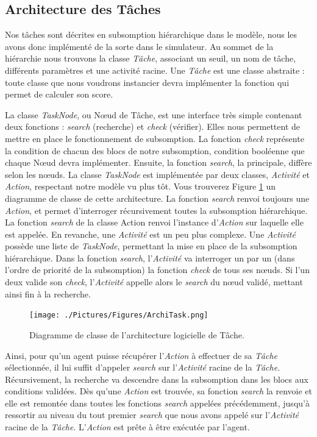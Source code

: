 			\subsection{Architecture des Tâches}
			Nos tâches sont décrites en subsomption hiérarchique dans le modèle, nous les avons donc implémenté de la sorte dans le simulateur. Au sommet de la hiérarchie nous trouvons la classe \textit{Tâche}, associant un seuil, un nom de tâche, différents paramètres et une activité racine. Une \textit{Tâche} est une classe abstraite : toute classe que nous voudrons instancier devra implémenter la fonction qui permet de calculer son score.
			
			La classe \textit{TaskNode}, ou Nœud de Tâche, est une interface très simple contenant deux fonctions : \textit{search} (recherche) et \textit{check} (vérifier). Elles nous permettent de mettre en place le fonctionnement de subsomption. La fonction \textit{check} représente la condition de chacun des blocs de notre subsomption, condition booléenne que chaque Nœud devra implémenter. Ensuite, la fonction \textit{search}, la principale, diffère selon les nœuds. La classe \textit{TaskNode} est implémentée par deux classes, \textit{Activité} et \textit{Action}, respectant notre modèle vu plus tôt. Vous trouverez Figure \ref{ArchiTask} un diagramme de classe de cette architecture. La fonction \textit{search} renvoi toujours une \textit{Action}, et permet d'interroger récursivement toutes la subsomption hiérarchique. La fonction \textit{search} de la classe Action renvoi l'instance d'\textit{Action} sur laquelle elle est appelée. En revanche, une \textit{Activité} est un peu plus complexe. Une \textit{Activité} possède une liste de \textit{TaskNode}, permettant la mise en place de la subsomption hiérarchique. Dans la fonction \textit{search}, l'\textit{Activité} va interroger un par un (dans l'ordre de priorité de la subsomption) la fonction \textit{check} de tous ses nœuds. Si l'un deux valide son \textit{check}, l'\textit{Activité} appelle alors le \textit{search} du nœud validé, mettant ainsi fin à la recherche.
			
			\begin{figure}
			\centering
			\texttt{[image: ./Pictures/Figures/ArchiTask.png]}
			\caption{Diagramme de classe de l'architecture logicielle de Tâche.}
			\label{ArchiTask}
			\end{figure}
			
			Ainsi, pour qu'un agent puisse récupérer l'\textit{Action} à effectuer de sa \textit{Tâche} sélectionnée, il lui suffit d'appeler \textit{search} sur l'\textit{Activité} racine de la \textit{Tâche}. Récursivement, la recherche va descendre dans la subsomption dans les blocs aux conditions validées. Dès qu'une \textit{Action} est trouvée, sa fonction \textit{search} la renvoie et elle est remontée dans toutes les fonctions \textit{search} appelées précédemment, jusqu'à ressortir au niveau du tout premier \textit{search} que nous avons appelé sur l'\textit{Activité} racine de la \textit{Tâche}. L'\textit{Action} est prête à être exécutée par l'agent.
			
